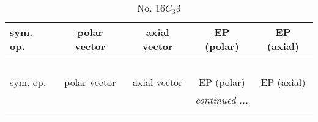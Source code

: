\documentclass[fleqn,10pt,landscape]{jsarticle}
\begin{document}
\begin{center}
\renewcommand{\arraystretch}{1.3}
\begin{longtable}{lcccc}
\caption{No. 16\quad$C_{3}$\quad$3$\quad[ trigonal ]}
 \\
 \hline \hline
sym. op. & polar vector & axial vector & EP (polar) & EP (axial) \\ \hline \endfirsthead

\multicolumn{4}{l}{\tablename\ \thetable{}} \\
 \hline \hline
sym. op. & polar vector & axial vector & EP (polar) & EP (axial) \\ \hline \endhead

 \hline \hline
\multicolumn{4}{r}{\footnotesize\it continued ...} \\ \endfoot

 \hline \hline
\multicolumn{4}{r}{} \\ \endlastfoot


\end{longtable}
\end{center}
\end{document}
